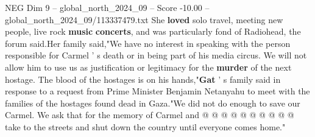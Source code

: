\begin{textsample}{NEG Dim 9 – global\_north\_2024\_09 – Score -10.00 – global\_north\_2024\_09/113337479.txt}
She \textbf{loved} solo travel, meeting new people, live rock \textbf{music} \textbf{concerts}, and was particularly fond of Radiohead, the forum said.Her family said,"We have no interest in speaking with the person responsible for Carmel ' s death or in being part of his media circus.
We will not allow him to use us as justification or legitimacy for the \textbf{murder} of the next hostage.
The blood of the hostages is on his hands,"\textbf{Gat} ' s family said in response to a request from Prime Minister Benjamin Netanyahu to meet with the families of the hostages found dead in Gaza."We did not do enough to save our Carmel.
We ask that for the memory of Carmel and @ @ @ @ @ @ @ @ @ @ take to the streets and shut down the country until everyone comes home."

\end{textsample}
